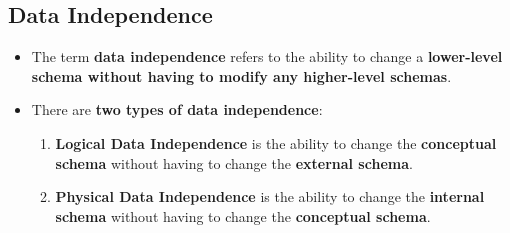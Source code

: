 \documentclass{article}
\begin{document}
    \subsection*{Data Independence}
    \begin{itemize}
        \item The term \textbf{data independence} refers to the ability to change a \textbf{lower-level schema without having to modify any higher-level schemas}.
        \item There are \textbf{two types of data independence}:
        \begin{enumerate}
            \item \textbf{Logical Data Independence} is the ability to change the \textbf{conceptual schema} without having to change the \textbf{external schema}.
            \item \textbf{Physical Data Independence} is the ability to change the \textbf{internal schema} without having to change the \textbf{conceptual schema}.
        \end{enumerate}
    \end{itemize}
\end{document}
